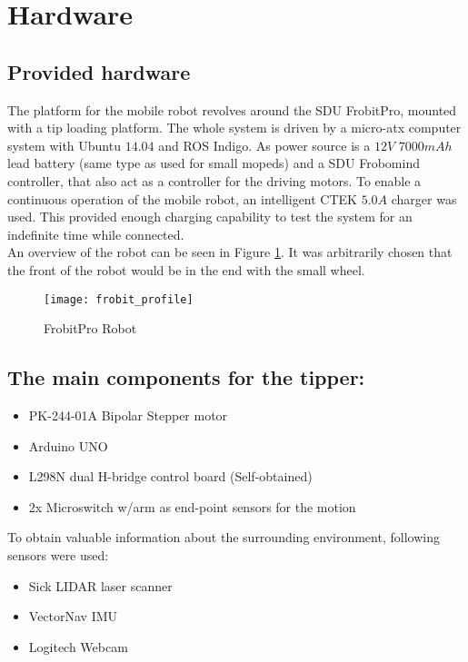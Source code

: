 \section{Hardware} %
\label{sec:mr_hardware}

\subsection{Provided hardware}
The platform for the mobile robot revolves around the SDU FrobitPro, mounted 
with a tip loading platform. The whole system is driven by a micro-atx computer 
system with Ubuntu $14.04$ and ROS Indigo. As power source is a $12V$ $7000mAh$ 
lead battery (same type as used for small mopeds) and a SDU Frobomind 
controller, that also act as a controller for the driving motors. To enable a 
continuous operation of the mobile robot, an intelligent CTEK $5.0A$ charger 
was used. This provided enough charging capability to test the system for an 
indefinite time while connected.\\ An overview of the robot can be seen in 
Figure \ref{fig:frobit}. It was arbitrarily chosen that the front of the robot 
would be in the end with the small wheel.\\
\begin{figure}[H]
	\centering
	\texttt{[image: frobit\_profile]}
	\caption{FrobitPro Robot}
	\label{fig:frobit}
	\end{figure}
\subsection{The main components for the tipper:}
\begin{itemize}
	\item PK-244-01A Bipolar Stepper motor
	\item Arduino UNO
	\item L298N dual H-bridge control board (Self-obtained)
	\item 2x Microswitch w/arm as end-point sensors for the motion
\end{itemize}   

To obtain valuable information about the surrounding environment, following sensors were used:
\begin{itemize}
	\item Sick LIDAR laser scanner
	\item VectorNav	 IMU
	\item Logitech Webcam
\end{itemize} 

